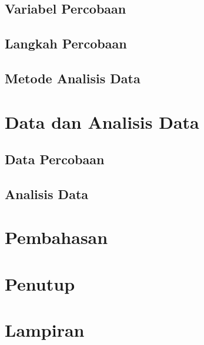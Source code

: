 \documentclass[a4paper, 12pt, oneside]{book}
\begin{document}
\section{Variabel Percobaan}

\section{Langkah Percobaan}

\section{Metode Analisis Data}


\chapter{Data dan Analisis Data}
\section{Data Percobaan}

\section{Analisis Data}


\chapter{Pembahasan}


\chapter{Penutup}





\chapter{Lampiran}

\end{document}
